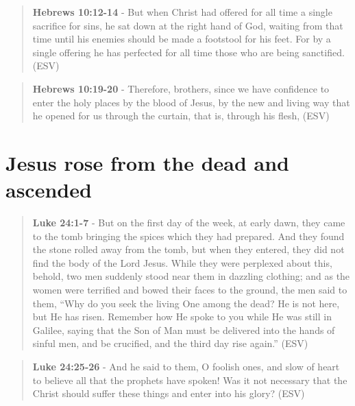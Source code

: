 \documentclass[11pt]{article}
\begin{document}
\begin{quote}
\textbf{Hebrews 10:12-14} - But when Christ had offered for all time a single sacrifice for sins, he sat down at the right hand of God, waiting from that time until his enemies should be made a footstool for his feet. For by a single offering he has perfected for all time those who are being sanctified. (ESV)
\end{quote}

\begin{quote}
\textbf{Hebrews 10:19-20} - Therefore, brothers, since we have confidence to enter the holy places by the blood of Jesus, by the new and living way that he opened for us through the curtain, that is, through his flesh, (ESV)
\end{quote}

\section{Jesus rose from the dead and ascended}
\label{sec:org4555e78}
\begin{quote}
\textbf{Luke 24:1-7} - But on the first day of the week, at early dawn, they came to the tomb bringing the spices which they had prepared. And they found the stone rolled away from the tomb, but when they entered, they did not find the body of the Lord Jesus. While they were perplexed about this, behold, two men suddenly stood near them in dazzling clothing; and as the women were terrified and bowed their faces to the ground, the men said to them, “Why do you seek the living One among the dead? He is not here, but He has risen. Remember how He spoke to you while He was still in Galilee, saying that the Son of Man must be delivered into the hands of sinful men, and be crucified, and the third day rise again.” (ESV)
\end{quote}

\begin{quote}
\textbf{Luke 24:25-26} - And he said to them, O foolish ones, and slow of heart to believe all that the prophets have spoken! Was it not necessary that the Christ should suffer these things and enter into his glory? (ESV)
\end{quote}
\end{document}
